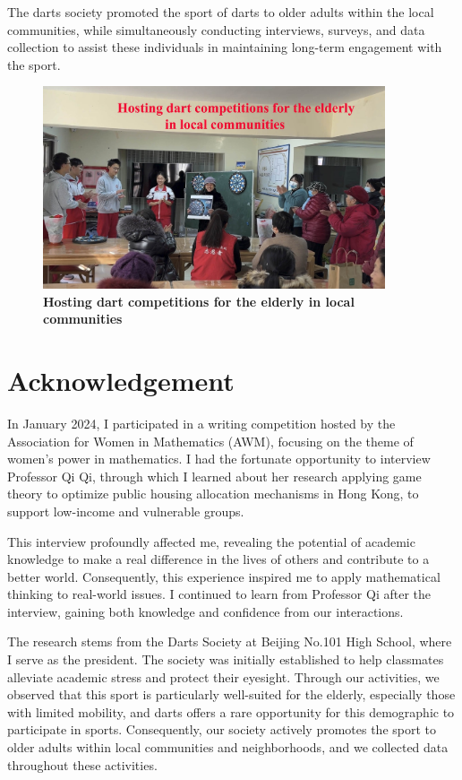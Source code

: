 \documentclass[cjjs]{ipart}
\theoremstyle{plain}
\begin{document}
\text The darts society promoted the sport of darts to older adults within the local communities, while simultaneously conducting interviews, surveys, and data collection to assist these individuals in maintaining long-term engagement with the sport.
\begin{figure}[H]
    \centering
    \includegraphics[width=0.90\textwidth]{14.jpg} 
    \caption{\textbf{Hosting dart competitions for the elderly in local communities}}
    \label{fig:dartboard}
\end{figure}


\section*{Acknowledgement}
\text In January 2024, I participated in a writing competition hosted by the Association for Women in Mathematics (AWM), focusing on the theme of women's power in mathematics. I had the fortunate opportunity to interview Professor Qi Qi, through which I learned about her research applying game theory to optimize public housing allocation mechanisms in Hong Kong, to support low-income and vulnerable groups.

This interview profoundly affected me, revealing the potential of academic knowledge to make a real difference in the lives of others and contribute to a better world. Consequently, this experience inspired me to apply mathematical thinking to real-world issues. I continued to learn from Professor Qi after the interview, gaining both knowledge and confidence from our interactions.

The research stems from the Darts Society at Beijing No.101 High School, where I serve as the president. The society was initially established to help classmates alleviate academic stress and protect their eyesight. Through our activities, we observed that this sport is particularly well-suited for the elderly, especially those with limited mobility, and darts offers a rare opportunity for this demographic to participate in sports.
Consequently, our society actively promotes the sport to older adults within local communities and neighborhoods, and we collected data throughout these activities.
\end{document}
